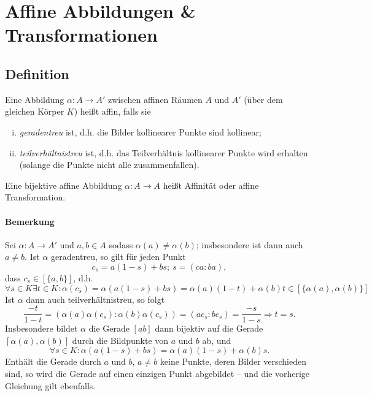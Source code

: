 \section{Affine Abbildungen \& Transformationen}
 \subsection{Definition}
 	\begin{Definition}
 		Eine Abbildung $ \alpha:A\to A' $ zwischen affinen Räumen $ A $ und $ A' $ (über dem gleichen Körper $ K $) heißt affin, falls sie
 		\begin{enumerate}[(i)]
 			\item \emph{geradentreu} ist, d.h. die Bilder kollinearer Punkte sind kollinear;
 			\item \emph{teilverhältnistreu} ist, d.h. das Teilverhältnis kollinearer Punkte wird erhalten (solange die Punkte nicht alle zusammenfallen).
 		\end{enumerate}
 		Eine bijektive affine Abbildung $ \alpha:A\to A $ heißt Affinität oder affine Transformation.
 	\end{Definition}

 	\paragraph{Bemerkung}
 		Sei $ \alpha:A\to A' $ und $ a,b\in A $ sodass $ \alpha(a)\neq \alpha(b) $; insbesondere ist dann auch $ a\neq b $. Ist $ \alpha $ geradentreu, so gilt für jeden Punkt
 		\[
 			c_s = a(1-s)+bs;\ s=(ca:ba),
 		\]
 		dass $ c_s\in [\{a,b\}] $, d.h.
 		\[
 			\forall s\in K\exists t\in K:\alpha(c_s) = \alpha(a(1-s)+bs) = \alpha(a)(1-t)+\alpha(b)t \in [\{\alpha(a),\alpha(b)\}]
 		\]
 		Ist $ \alpha $ dann auch teilverhältnistreu, so folgt
 		\[
 			\frac{-t}{1-t} = (\alpha(a)\alpha(c_s):\alpha(b)\alpha(c_s)) = (ac_s:bc_s) = \frac{-s}{1-s} \Rightarrow t = s.
 		\]
 		Insbesondere bildet $ \alpha $ die Gerade $ [ab] $ dann bijektiv auf die Gerade $ [\alpha(a),\alpha(b)] $ durch die Bildpunkte von $ a $ und $ b $ ab, und
 		\[
 			\forall s\in K:\alpha(a(1-s)+bs)=\alpha(a)(1-s)+\alpha(b)s.
 		\]
 		Enthält die Gerade durch $ a $ und $ b $, $ a\neq b $ keine Punkte, deren Bilder verschieden sind, so wird die Gerade auf einen einzigen Punkt abgebildet -- und die vorherige Gleichung gilt ebenfalls.

